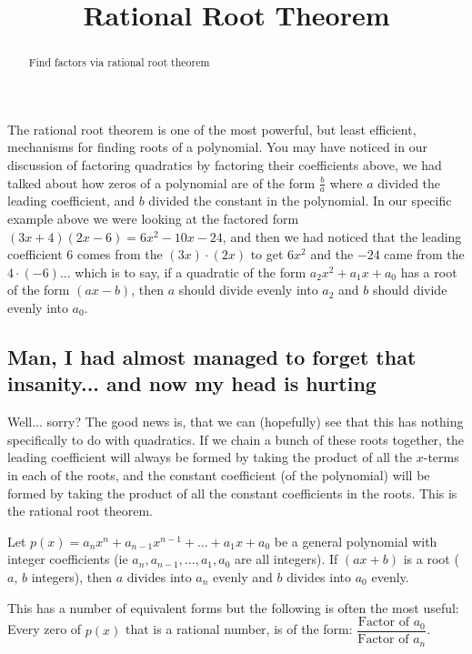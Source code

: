 \documentclass{ximeraXloud}
\title{Rational Root Theorem}
\begin{document}
\begin{abstract}
Find factors via rational root theorem
\end{abstract}
\maketitle

The rational root theorem is one of the most powerful, but least efficient, mechanisms for finding roots of a polynomial. You may have noticed in our discussion of factoring quadratics by factoring their coefficients above, we had talked about how zeros of a polynomial are of the form $\frac{b}{a}$ where $a$ divided the leading coefficient, and $b$ divided the constant in the polynomial. In our specific example above we were looking at the factored form $(3x + 4)(2x - 6) = 6x^2 - 10x - 24$, and then we had noticed that the leading coefficient $6$ comes from the $(3x) \cdot (2x)$ to get $6x^2$ and the $-24$ came from the $4 \cdot (-6)$... which is to say, if a quadratic of the form $a_2x^2 + a_1x + a_0$ has a root of the form $(ax - b)$, then $a$ should divide evenly into $a_2$ and $b$ should divide evenly into $a_0$.

\subsection*{Man, I had almost managed to forget that insanity... and now my head is hurting}
    Well... sorry? The good news is, that we can (hopefully) see that this has nothing specifically to do with quadratics. If we chain a bunch of these roots together, the leading coefficient will always be formed by taking the product of all the $x$-terms in each of the roots, and the constant coefficient (of the polynomial) will be formed by taking the product of all the constant coefficients in the roots. This is the rational root theorem.
    
    \begin{theorem}
        Let $p(x) = a_nx^n + a_{n-1}x^{n-1} + \dots + a_1x + a_0$ be a general polynomial with integer coefficients (ie $a_n, a_{n-1}, ..., a_1, a_0$ are all integers). If $(ax + b)$ is a root ($a$, $b$ integers), then  $a$ divides into $a_n$ evenly and $b$ divides into $a_0$ evenly.
        
        This has a number of equivalent forms but the following is often the most useful:
        Every zero of $p(x)$ that is a rational number, is of the form: $\dfrac{\text{Factor of }a_0}{\text{Factor of }a_n}$.
    \end{theorem}
    
\end{document}
